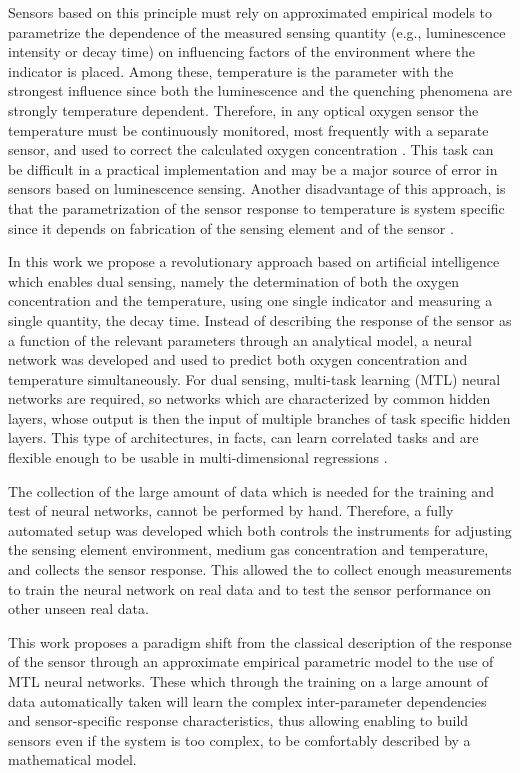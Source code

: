 \documentclass[9pt,twocolumn,twoside,pdftex]{optica}
\begin{document}
Sensors based on this principle must rely on approximated empirical models to parametrize the dependence of the measured sensing quantity (e.g., luminescence intensity or decay time) on influencing factors of the environment where the indicator is placed. Among these, temperature is the parameter with the strongest influence since both the luminescence and the quenching phenomena are strongly temperature dependent. Therefore, in any optical oxygen sensor the temperature must be continuously monitored, most frequently with a separate sensor, and used to correct the calculated oxygen concentration \cite{Li2015}. This task can be difficult in a practical implementation and may be a major source of error in sensors based on luminescence sensing. Another disadvantage of this approach, is that the parametrization of the sensor response to temperature is system specific since it depends  on fabrication of the sensing element and of the sensor \cite{Xu1994,Draxler1995,Hartmann1996,Mills1998,Badocco2008,Dini2011}.

In this work we propose a revolutionary approach based on artificial intelligence which enables dual sensing, namely the determination of both the oxygen concentration and the temperature, using one single indicator and measuring a single quantity,  the decay time. Instead of describing the response of the sensor as a function of the relevant parameters through an analytical model, a neural network was developed and used to predict both oxygen concentration and temperature simultaneously.
For dual sensing, multi-task learning (MTL) neural networks are required, so networks which are characterized by common hidden layers, whose output is then the input of multiple branches of task specific hidden layers. This type of architectures, in facts, can learn correlated tasks \cite{Thrun1996, Caruana1997, Zhang2017, Baxter2000, Thung2018} and are flexible enough to be usable in multi-dimensional regressions \cite{Michelucci2019_2}.

The collection of the large amount of data which is needed for the training and test of neural networks, cannot be performed by hand. Therefore, a fully automated setup was developed which both controls the instruments for adjusting the sensing element environment, medium gas concentration and temperature, and collects the sensor response. This allowed the to collect enough measurements to train the neural network on real data and to test the sensor performance on other unseen real data.

This work proposes a paradigm shift from the classical description of the response of the sensor through an approximate empirical parametric model to the use of MTL neural networks. These which through the training on a large amount of data automatically taken will learn the complex inter-parameter dependencies and sensor-specific response characteristics, thus allowing enabling to build sensors even if the system is too complex, to be comfortably described by a mathematical model.
\end{document}

